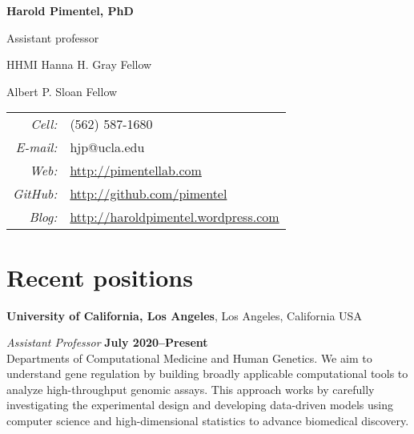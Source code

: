 \documentclass[11pt,notitlepage]{article} %
\begin{document}
\thispagestyle{firststyle}





\begin{center}
  {\Huge \bf Harold Pimentel, PhD}

  \medskip
  {\large Assistant professor}

  \medskip

  {\large HHMI Hanna H. Gray Fellow}

  \medskip

  {\large Albert P. Sloan Fellow}

\end{center}
\bigskip
\begin{tabular}{r l}
  {\it Cell:}&  {(562) 587-1680} \\
  {\it E-mail:}&  {hjp@ucla.edu} \\
  {\it Web:}& {\url{http://pimentellab.com}} \\
  {\it GitHub:}& {\url{http://github.com/pimentel}} \\
  {\it Blog:}& {\url{http://haroldpimentel.wordpress.com}} \\
\end{tabular}

\bigskip
\section*{Recent positions}
\medskip

{\bf University of California, Los Angeles}, Los Angeles, California USA

{\em Assistant Professor} \hfill {\bf July 2020--Present}\\
Departments of Computational Medicine and Human Genetics.
We aim to understand gene regulation by building broadly applicable computational tools to analyze high-throughput genomic assays.
This approach works by carefully investigating the experimental design and developing data-driven models using computer science and high-dimensional statistics to advance biomedical discovery.
\end{document}
